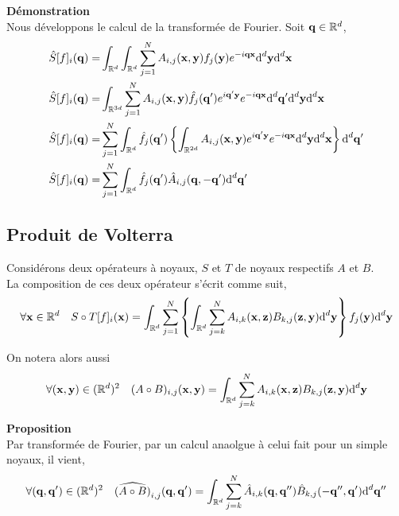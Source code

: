\documentclass[10pt]{article}
\begin{document}
\textbf{Démonstration}\\
Nous développons le calcul de la transformée de Fourier. Soit ${\bf q} \in \mathbb{R}^d$,
\begin{align}
 \hat{S}[f]_i({\bf q})  = & \int_{\mathbb{R}^d} \int_{\mathbb{R}^d} \sum_{j=1}^{N} A_{i,j}({\bf x},{\bf y})f_j({\bf y}) e^{-i{\bf q}{\bf x}} \text{d}^d {\bf y} \text{d}^d {\bf x} \\
 \hat{S}[f]_i({\bf q})  = & \int_{\mathbb{R}^{3d}} \sum_{j=1}^{N} A_{i,j}({\bf x},{\bf y}) \hat{f}_j({\bf q}') e^{i{\bf q}'{\bf y}} e^{- i{\bf q}{\bf x}}  \text{d}^d {\bf q}' \text{d}^d {\bf y} \text{d}^d {\bf x} \\
 \hat{S}[f]_i({\bf q})  = &    \sum_{j=1}^{N} \int_{\mathbb{R}^d} \hat{f}_j({\bf q}') \left\{ \int_{\mathbb{R}^{2d}} A_{i,j}({\bf x},{\bf y})  e^{i{\bf q}'{\bf y}} e^{- i{\bf q}{\bf x}}  \text{d}^d {\bf y} \text{d}^d {\bf x}   \right\} \text{d}^d {\bf q}'\\
\hat{S}[f]_i({\bf q})  = &    \sum_{j=1}^{N} \int_{\mathbb{R}^d} \hat{f}_j({\bf q}') \hat{A}_{i,j}({\bf q}, -{\bf q}') \text{d}^d {\bf q}'\\
\end{align}

\vspace*{11pt}

\subsection{Produit de Volterra}

Considérons deux opérateurs à noyaux, $S$ et $T$ de noyaux respectifs $A$ et $B$. \\
La composition de ces deux opérateur s'écrit comme suit,
\begin{equation}
  \forall {\bf x} \in \mathbb{R}^d \quad S \circ T [f]_i ({\bf x}) = \int_{\mathbb{R}^d}  \sum_{j=1}^{N} \left\{ \int_{\mathbb{R}^d} \sum_{j=k}^{N}A_{i,k}({\bf x}, {\bf z})B_{k,j}({\bf z}, {\bf y})  \text{d}^d {\bf y} \right\} f_j({\bf y})  \text{d}^d {\bf y}
\end{equation}

On notera alors aussi
\begin{equation}
    \forall ({\bf x}, {\bf y}) \in (\mathbb{R}^d)^2 \quad (A \circ B)_{i,j} ({\bf x}, {\bf y}) = \int_{\mathbb{R}^d} \sum_{j=k}^{N}A_{i,k}({\bf x}, {\bf z})B_{k,j}({\bf z}, {\bf y})  \text{d}^d {\bf y} 
\end{equation}

\textbf{Proposition}\\
Par transformée de Fourier, par un calcul anaolgue à celui fait pour un simple noyaux, il vient,
\begin{equation}
\forall ({\bf q}, {\bf q}') \in (\mathbb{R}^d)^2 \quad\widehat{(A \circ B)}_{i,j}({\bf q}, {\bf q}') =\int_{\mathbb{R}^d} \sum_{j=k}^{N}\hat{A}_{i,k}({\bf q}, {\bf q}'')\hat{B}_{k,j}(-{\bf q}'', {\bf q}')  \text{d}^d {\bf q}'' 
\end{equation}
\end{document}
